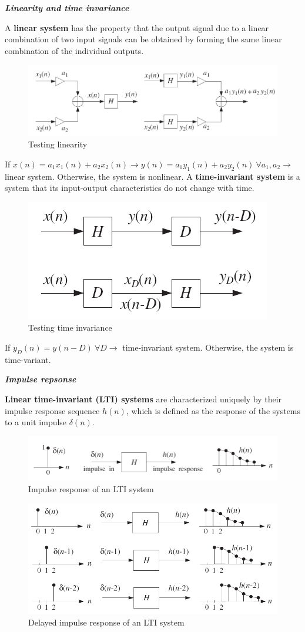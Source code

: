 \documentclass[11pt, a4paper]{article}
\begin{document}
\textbf{\textit{Linearity and time invariance}}

A \textbf{linear system} has the property that the output signal due to a linear combination of two input signals can be obtained by forming the same linear combination of the individual outputs.
\begin{figure}[h!]
    \centering
    \includegraphics[width=0.6\linewidth]{img/31.png}
    \caption{Testing linearity}
\end{figure}

If $x(n)=a_1x_1(n)+a_2x_2(n) \to y(n)=a_1y_1(n)+a_2y_2(n) \ \forall a_1,a_2 \to$ linear system. Otherwise, the system is nonlinear.
\newpage
A \textbf{time-invariant system} is a system that its input-output characteristics do not change with time.
\begin{figure}[h!]
    \centering
    \includegraphics[width=0.5\linewidth]{img/32.png}
    \caption{Testing time invariance}
\end{figure}

If $y_D(n)=y(n-D) \ \forall D \to$ time-invariant system. Otherwise, the system is time-variant.

\textbf{\textit{Impulse repsonse}}

\textbf{Linear time-invariant (LTI) systems} are characterized uniquely by their impulse response sequence $h(n)$, which is defined as the response of the systems to a unit impulse $\delta(n)$.
\begin{figure}[h!]
    \centering
    \includegraphics[width=0.5\linewidth]{img/33.png}
    \caption{Impulse response of an LTI system}
\end{figure}
\begin{figure}[h!]
    \centering
    \includegraphics[width=0.5\linewidth]{img/34.png}
    \caption{Delayed impulse response of an LTI system}
\end{figure}
\end{document}
